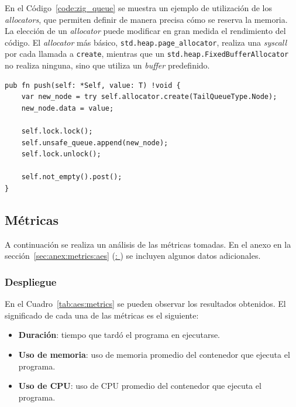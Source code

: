 \documentclass[11pt]{article}
\let\Oldsubsection\subsection
\renewcommand{\subsection}{\FloatBarrier\Oldsubsection}
\let\Oldsubsubsection\subsubsection
\renewcommand{\subsubsection}{\FloatBarrier\Oldsubsubsection}
\newcommand{\english}[1]{\textit{#1}}
\begin{document}
En el Código~\ref{code:zig_queue} se muestra un ejemplo de utilización de los \english{allocators}, que permiten definir de manera precisa cómo se reserva la memoria. La elección de un \english{allocator} puede modificar en gran medida el rendimiento del código. El \english{allocator} más básico, \lstinline{std.heap.page_allocator}, realiza una \english{syscall} por cada llamada a \lstinline{create}, mientras que un \lstinline{std.heap.FixedBufferAllocator} no realiza ninguna, sino que utiliza un \english{buffer} predefinido.

\begin{listing}[h]
\begin{verbatim}
pub fn push(self: *Self, value: T) !void {
    var new_node = try self.allocator.create(TailQueueType.Node);
    new_node.data = value;

    self.lock.lock();
    self.unsafe_queue.append(new_node);
    self.lock.unlock();

    self.not_empty().post();
}
\end{verbatim}
\caption{Implementación del método \lstinline{push} de la \english{Queue} \english{thread-safe} en Zig}
\label{code:zig_queue}
\end{listing}

\newpage

\subsection{Métricas}

A continuación se realiza un análisis de las métricas tomadas. En el anexo en la sección~\ref{sec:anex:metrics:aes} (\hyperref[sec:anex:metrics:aes]{: }) se incluyen algunos datos adicionales.

\subsubsection{Despliegue}

En el Cuadro~\ref{tab:aes:metrics} se pueden observar los resultados obtenidos. El significado de cada una de las métricas es el siguiente:

\begin{itemize}
    \item \textbf{Duración}: tiempo que tardó el programa en ejecutarse.
    \item \textbf{Uso de memoria}: uso de memoria promedio del contenedor que ejecuta el programa.
    \item \textbf{Uso de CPU}: uso de CPU promedio del contenedor que ejecuta el programa.
\end{itemize}
\end{document}

